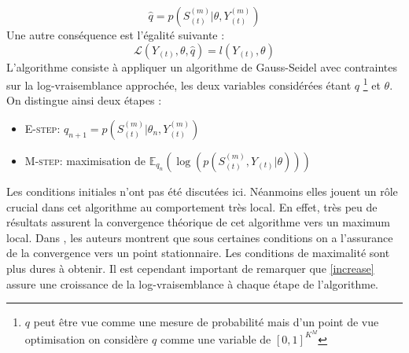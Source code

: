 \documentclass[10pt,a4paper]{article}
\newcommand{\Estep}{\textsc{E-step}}
\newcommand{\Mstep}{\textsc{M-step}}
\begin{document}
\begin{equation}
\hat{q}=p(S_{(t)}^{(m)} \vert \theta,Y_{(t)}^{(m)})
\end{equation} 
Une autre conséquence est l'égalité suivante :
\begin{equation}
\mathcal{L}(Y_{(t)},\theta,\hat{q})=l(Y_{(t)},\theta) \label{increase}
\end{equation}
L'algorithme consiste à appliquer un algorithme de Gauss-Seidel avec contraintes sur la log-vraisemblance approchée, les deux variables considérées étant $q$ \footnote{$q$ peut être vue comme une mesure de probabilité mais d'un point de vue optimisation on considère $q$ comme une variable de $[0,1]^{K^M}$} et $\theta$. On distingue ainsi deux étapes :
\begin{itemize}
\item \Estep : $q_{n+1}=p(S_{(t)}^{(m)} \vert \theta_n,Y_{(t)}^{(m)})$
\item \Mstep : maximisation de $\mathbb{E}_{q_n} \left( \log \left( p(S_{(t)}^{(m)}, Y_{(t)}  \vert  \theta )\right) \right)$
\end{itemize}
Les conditions initiales n'ont pas été discutées ici. Néanmoins elles jouent un rôle crucial dans cet algorithme au comportement très local. En effet, très peu de résultats assurent la convergence théorique de cet algorithme vers un maximum local. Dans \cite{wu1983convergence}, les auteurs montrent que sous certaines conditions on a l'assurance de la convergence vers un point stationnaire. Les conditions de maximalité sont plus dures à obtenir. Il est cependant important de remarquer que \ref{increase} assure une croissance de la log-vraisemblance à chaque étape de l'algorithme.
\end{document}
